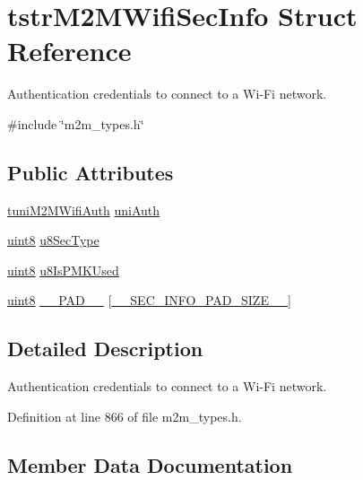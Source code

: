 \hypertarget{structtstrM2MWifiSecInfo}{}\section{tstr\+M2\+M\+Wifi\+Sec\+Info Struct Reference}
\label{structtstrM2MWifiSecInfo}


Authentication credentials to connect to a Wi-\/\+Fi network.  




{\ttfamily \#include \char`\"{}m2m\+\_\+types.\+h\char`\"{}}

\subsection*{Public Attributes}
\begin{DoxyCompactItemize}
\item 
\hyperlink{uniontuniM2MWifiAuth}{tuni\+M2\+M\+Wifi\+Auth} \hyperlink{structtstrM2MWifiSecInfo_abdd40dd09a9db1ae2952ab8de06d3274}{uni\+Auth}
\item 
\hyperlink{group__DataT_ga4df709a77647e870bbf1d955b8edc9a6}{uint8} \hyperlink{structtstrM2MWifiSecInfo_a22de34616e189f348274276e57d9d909}{u8\+Sec\+Type}
\item 
\hyperlink{group__DataT_ga4df709a77647e870bbf1d955b8edc9a6}{uint8} \hyperlink{structtstrM2MWifiSecInfo_acd91f409d3ade8e74232ed8c28df6e15}{u8\+Is\+P\+M\+K\+Used}
\item 
\hyperlink{group__DataT_ga4df709a77647e870bbf1d955b8edc9a6}{uint8} \hyperlink{structtstrM2MWifiSecInfo_a19f44cadbfcf524d5c0780755b55e934}{\+\_\+\+\_\+\+P\+A\+D\+\_\+\+\_\+} \mbox{[}\hyperlink{m2m__types_8h_a6d1f0ba36c9711cd0f57f6d10677a994}{\+\_\+\+\_\+\+S\+E\+C\+\_\+\+I\+N\+F\+O\+\_\+\+P\+A\+D\+\_\+\+S\+I\+Z\+E\+\_\+\+\_\+}\mbox{]}
\end{DoxyCompactItemize}


\subsection{Detailed Description}
Authentication credentials to connect to a Wi-\/\+Fi network. 

Definition at line 866 of file m2m\+\_\+types.\+h.



\subsection{Member Data Documentation}
\mbox{\label{structtstrM2MWifiSecInfo_a19f44cadbfcf524d5c0780755b55e934}} 
